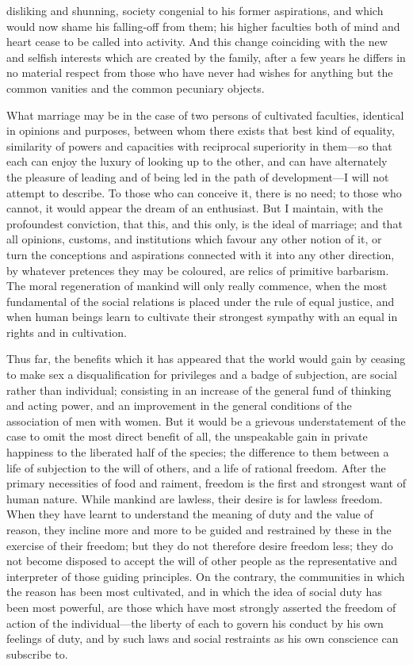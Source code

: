 \documentclass[12pt]{report}
\begin{document}
disliking and shunning, society congenial to his former aspirations, and which would now shame his falling-off from them; his higher faculties both of mind and heart cease to be called into activity. And this change coinciding with the new and selfish interests which are created by the family, after a few years he differs in no material respect from those who have never had wishes for anything but the common vanities and the common pecuniary objects.

What marriage may be in the case of two persons of cultivated faculties, identical in opinions and purposes, between whom there exists that best kind of equality, similarity of powers and capacities with reciprocal superiority in them—so that each can enjoy the luxury of looking up to the other, and can have alternately the pleasure of leading and of being led in the path of development—I will not attempt to describe. To those who can conceive it, there is no need; to those who cannot, it would appear the dream of an enthusiast. But I maintain, with the profoundest conviction, that this, and this only, is the ideal of marriage; and that all opinions, customs, and institutions which favour any other notion of it, or turn the conceptions and aspirations connected with it into any other direction, by whatever pretences they may be coloured, are relics of primitive barbarism. The moral regeneration of mankind will only really commence, when the most fundamental of the social relations is placed under the rule of equal justice, and when human beings learn to cultivate their strongest sympathy with an equal in rights and in cultivation.

Thus far, the benefits which it has appeared that the world would gain by ceasing to make sex a disqualification for privileges and a badge of subjection, are social rather than individual; consisting in an increase of the general fund of thinking and acting power, and an improvement in the general conditions of the association of men with women. But it would be a grievous understatement of the case to omit the most direct benefit of all, the unspeakable gain in private happiness to the liberated half of the species; the difference to them between a life of subjection to the will of others, and a life of rational freedom. After the primary necessities of food and raiment, freedom is the first and strongest want of human nature. While mankind are lawless, their desire is for lawless freedom. When they have learnt to understand the meaning of duty and the value of reason, they incline more and more to be guided and restrained by these in the exercise of their freedom; but they do not therefore desire freedom less; they do not become disposed to accept the will of other people as the representative and interpreter of those guiding principles. On the contrary, the communities in which the reason has been most cultivated, and in which the idea of social duty has been most powerful, are those which have most strongly asserted the freedom of action of the individual—the liberty of each to govern his conduct by his own feelings of duty, and by such laws and social restraints as his own conscience can subscribe to.
\end{document}
